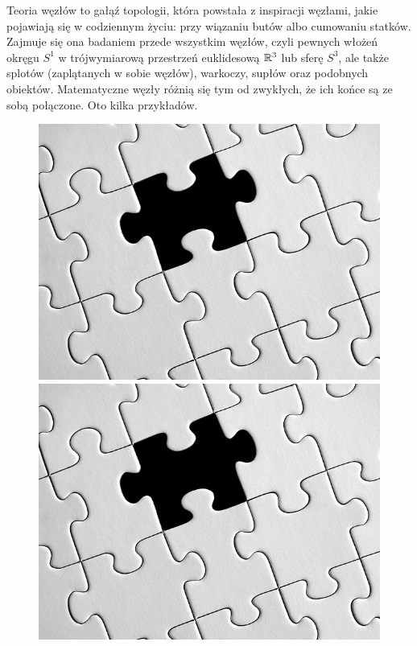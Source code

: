 Teoria węzłów to gałąź topologii,
która powstała z inspiracji węzłami,
jakie pojawiają się w codziennym życiu: przy wiązaniu butów albo cumowaniu statków.
Zajmuje się ona badaniem przede wszystkim węzłów,
czyli pewnych włożeń okręgu $S^1$ w trójwymiarową przestrzeń euklidesową $\mathbb R^3$ lub sferę $S^3$,
ale także splotów (zaplątanych w sobie węzłów), warkoczy, supłów oraz podobnych obiektów.
Matematyczne węzły różnią się tym od zwykłych, że ich końce są ze sobą połączone.
Oto kilka przykładów.

\begin{figure}[H]
	\begin{minipage}[b]{.11\linewidth}
		\centering
		\includegraphics[width=\linewidth]{../data/missing.jpg}
	\end{minipage}
	\begin{minipage}[b]{.11\linewidth}
		\centering
		\includegraphics[width=\linewidth]{../data/missing.jpg}

\end{minipage}
\end{figure}
